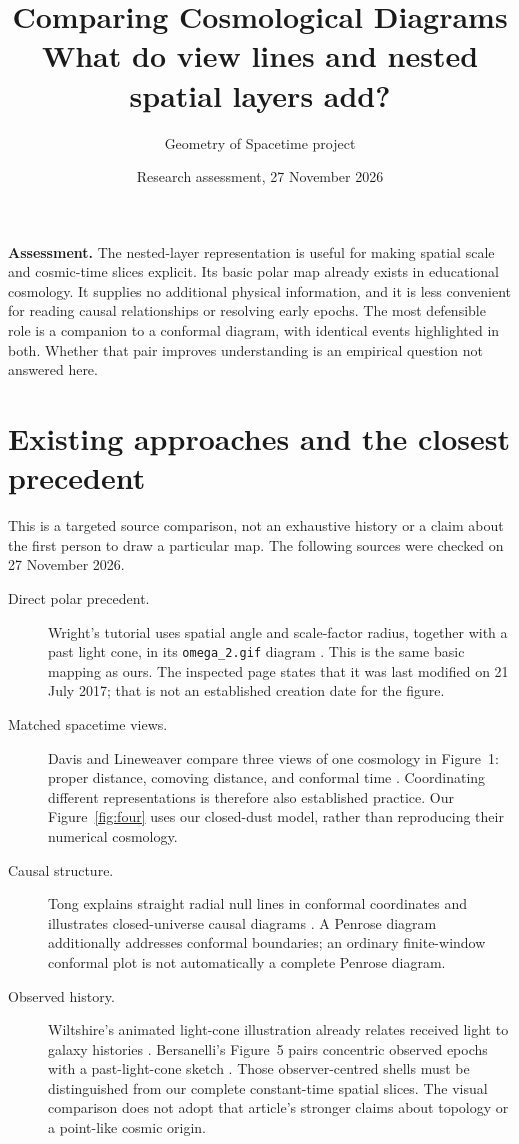 \documentclass[11pt,a4paper]{article}
\title{Comparing Cosmological Diagrams\\[0.4em]\large What do view lines and nested spatial layers add?}
\author{Geometry of Spacetime project}
\date{Research assessment, 27 November 2026}
\begin{document}
\maketitle

\noindent\textbf{Assessment.} The nested-layer representation is useful for
making spatial scale and cosmic-time slices explicit. Its basic polar map
already exists in educational cosmology. It supplies no additional physical
information, and it is less convenient for reading causal relationships
or resolving early epochs. The most defensible role is a companion to a
conformal diagram, with identical events highlighted in both. Whether that
pair improves understanding is an empirical question not answered here.

\section{Existing approaches and the closest precedent}
This is a targeted source comparison, not an exhaustive history or a claim
about the first person to draw a particular map. The following sources were
checked on 27 November 2026.

\begin{description}
\item[Direct polar precedent.] Wright's tutorial uses spatial angle and
scale-factor radius, together with a past light cone, in its
\texttt{omega\_2.gif} diagram \citep{WrightTutorial}. This is the same basic
mapping as ours. The inspected page states that it was last modified on
21 July 2017; that is not an established creation date for the figure.
\item[Matched spacetime views.] Davis and Lineweaver compare three views of
one cosmology in Figure~1: proper distance, comoving distance, and conformal
time \citep{DavisLineweaver2004}. Coordinating different representations
is therefore also established practice. Our Figure~\ref{fig:four} uses our
closed-dust model, rather than reproducing their numerical cosmology.
\item[Causal structure.] Tong explains straight radial null lines in
conformal coordinates and illustrates closed-universe causal diagrams
\citep{TongCosmology}. A Penrose diagram additionally addresses conformal
boundaries; an ordinary finite-window conformal plot is not automatically
a complete Penrose diagram.
\item[Observed history.] Wiltshire's animated light-cone illustration
already relates received light to galaxy histories \citep{WiltshireLightCone}.
Bersanelli's Figure~5 pairs concentric observed epochs with a past-light-cone
sketch \citep{Bersanelli2016}. Those observer-centred shells must be
distinguished from our complete constant-time spatial slices. The visual
comparison does not adopt that article's stronger claims about topology
or a point-like cosmic origin.
\end{description}
\end{document}
